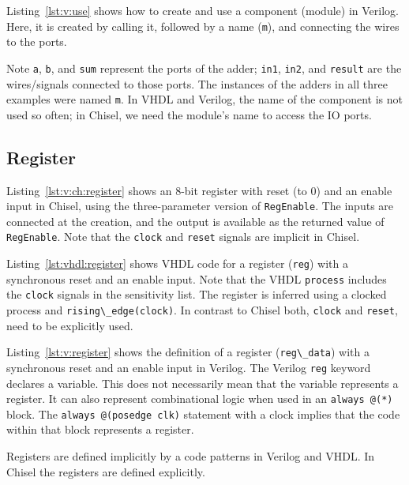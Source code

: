 \documentclass[%
    10pt,
    headinclude, footexclude,
    openright, %
    notitlepage,
    cleardoubleempty,
    headsepline,
    pointlessnumbers,
    bibtotoc, idxtotoc,
    ]{scrbook}
\newcommand{\code}[1]{{\lstinline[basicstyle=\small\ttfamily]{#1}}}
\begin{document}
Listing~\ref{lst:v:use} shows how to create and use a component (module)
in Verilog. Here, it is created by calling it, followed by a name (\code{m}),
and connecting the wires to the ports.

Note \code{a}, \code{b}, and \code{sum} represent the ports of the adder;
\code{in1}, \code{in2}, and \code{result} are the wires/signals connected to those ports.
The instances of the adders in all three examples were named \code{m}.
In VHDL and Verilog, the name of the component is not used so often; in Chisel, we need
the module's name to access the IO ports.

\subsection{Register}


Listing~\ref{lst:v:ch:register} shows an 8-bit register with reset (to 0) and an enable input in Chisel,
using the three-parameter version of \code{RegEnable}. The inputs are connected at the creation,
and the output is available as the returned value of \code{RegEnable}.
Note that the \code{clock} and \code{reset} signals are implicit in Chisel.


Listing~\ref{lst:vhdl:register} shows VHDL code for a
register (\code{reg}) with a synchronous reset and an enable input.
Note that the VHDL \code{process} includes the \code{clock}
signals in the sensitivity list. The register is inferred using
a clocked process and \code{rising\_edge(clock)}.
In contrast to Chisel both, \code{clock} and \code{reset}, need to
be explicitly used.




Listing~\ref{lst:v:register} shows the definition of a
register (\code{reg\_data}) with a synchronous reset and an enable input in Verilog.
The Verilog \code{reg} keyword declares a variable. This does not necessarily mean
that the variable represents a register. It can also represent combinational logic
when used in an \code{always @(*)} block.
The \code{always @(posedge clk)} statement with a clock implies that the code within that block
represents a register.

Registers are defined implicitly by a code patterns in Verilog
and VHDL. In Chisel the registers are defined explicitly.
\end{document}
